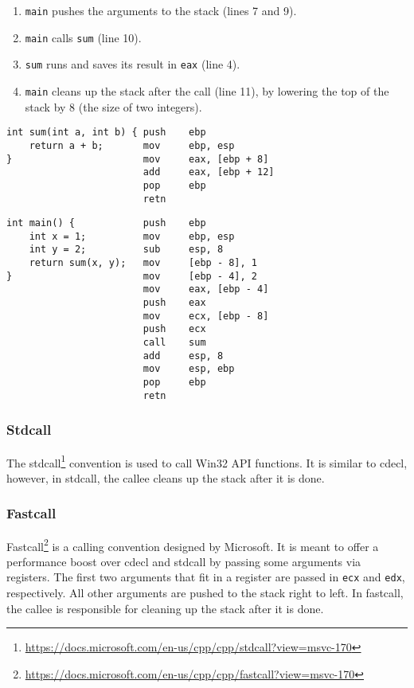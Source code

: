 \begin{enumerate}
    \item \texttt{main} pushes the arguments to the stack (lines 7 and 9).
    \item \texttt{main} calls \texttt{sum} (line 10).
    \item \texttt{sum} runs and saves its result in \texttt{eax} (line 4).
    \item \texttt{main} cleans up the stack after the call (line 11), by lowering the top of the stack by 8 (the size of two integers).
\end{enumerate}

\begin{lstlisting}[label={listing:sum cdecl}, caption={The C code and assembly of a function that uses cdecl.}, captionpos=b]
int sum(int a, int b) { push    ebp
    return a + b;       mov     ebp, esp
}                       mov     eax, [ebp + 8]
                        add     eax, [ebp + 12]
                        pop     ebp
                        retn
\end{lstlisting}

\begin{lstlisting}[label={listing:main cdecl}, caption={The C code and assembly of a function calling the function from \autoref{listing:sum cdecl} using cdecl.}, captionpos=b]
int main() {            push    ebp
    int x = 1;          mov     ebp, esp
    int y = 2;          sub     esp, 8
    return sum(x, y);   mov     [ebp - 8], 1
}                       mov     [ebp - 4], 2
                        mov     eax, [ebp - 4]
                        push    eax
                        mov     ecx, [ebp - 8]
                        push    ecx
                        call    sum
                        add     esp, 8
                        mov     esp, ebp
                        pop     ebp
                        retn
\end{lstlisting}

\subsubsection{Stdcall}
The stdcall\footnote{\tiny \url{https://docs.microsoft.com/en-us/cpp/cpp/stdcall?view=msvc-170}} convention is used to call Win32 API functions. It is similar to cdecl, however, in stdcall, the callee cleans up the stack after it is done.

\subsubsection{Fastcall}
Fastcall\footnote{\tiny \url{https://docs.microsoft.com/en-us/cpp/cpp/fastcall?view=msvc-170}} is a calling convention designed by Microsoft. It is meant to offer a performance boost over cdecl and stdcall by passing some arguments via registers. The first two arguments that fit in a register are passed in \texttt{ecx} and \texttt{edx}, respectively. All other arguments are pushed to the stack right to left. In fastcall, the callee is responsible for cleaning up the stack after it is done.

